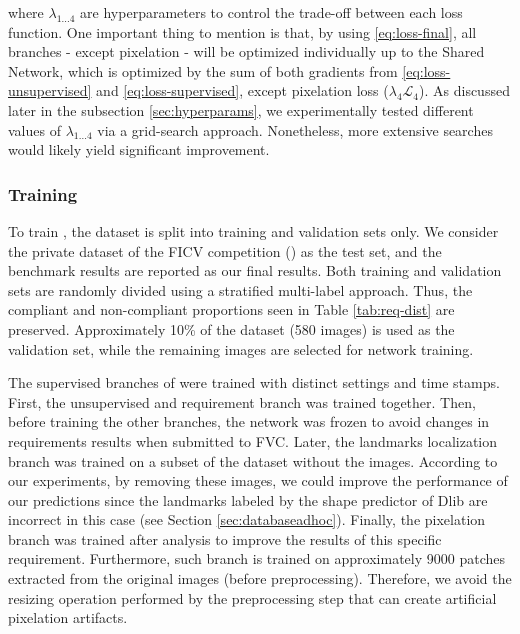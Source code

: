 \noindent where $\lambda_{1...4}$ are hyperparameters to control the trade-off between each loss function. One important thing to mention is that, by using \autoref{eq:loss-final}, all branches - except pixelation - will be optimized individually up to the Shared Network, which is optimized by the sum of both gradients from \autoref{eq:loss-unsupervised} and \autoref{eq:loss-supervised}, except pixelation loss ($\lambda_4\mathcal{L}_4$). As discussed later in the subsection \ref{sec:hyperparams}, we experimentally tested different values of $\lambda_{1...4}$ via a grid-search approach. Nonetheless, more extensive searches would likely yield significant improvement.

\subsubsection{Training} 

To train \methodname, the \adhoc dataset is split into training and validation sets only. We consider the private dataset of the FICV competition (\ficvofficial) as the test set, and the benchmark results are reported as our final results. Both training and validation sets are randomly divided using a stratified multi-label approach. Thus, the compliant and non-compliant proportions seen in Table \ref{tab:req-dist} are preserved. Approximately 10\% of the dataset (580 images) is used as the validation set, while the remaining images are selected for network training.

The supervised branches of \methodname were trained with distinct settings and time stamps. First, the unsupervised and requirement branch was trained together. Then, before training the other branches, the network was frozen to avoid changes in requirements results when submitted to FVC. Later, the landmarks localization branch was trained on a subset of the \adhoc dataset without the \darktintedlenses images. According to our experiments, by removing these images, we could improve the performance of our predictions since the landmarks labeled by the shape predictor of Dlib are incorrect in this case (see Section \ref{sec:databaseadhoc}). Finally, the pixelation branch was trained after analysis to improve the results of this specific requirement. Furthermore, such branch is trained on approximately 9000 patches extracted from the original images (before preprocessing). Therefore, we avoid the resizing operation performed by the preprocessing step that can create artificial pixelation artifacts.

